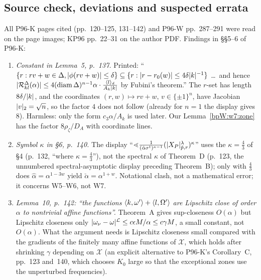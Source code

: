 \subsection{Source check, deviations and suspected errata}\label{bpW:w7:check}

\begin{remark}\label{bpW:w7:errata}
All P96-K pages cited (pp.~120--125, 131--142) and P96-W pp.~287--291 were read on the page images; KP96
pp.~22--31 on the author PDF. Findings in \S\S5--6 of P96-K:
\begin{enumerate}[label=(\alph*)]
\item \emph{Constant in Lemma~5, p.~137.} Printed: ``$\{r:rv+w\in\Delta,\lvert \phi(rv+w)\rvert\le\delta\}\subseteq\{r:
  \lvert r-r_0(w)\rvert\le4\delta\lvert k\rvert^{-1}\}$ \dots\ and hence $\lvert \mathcal R^\Delta_{kl}(\alpha)\rvert\le4(\operatorname{diam}
  \Delta)^{n-1}\alpha\cdot\frac{\langle l\rangle_d}{A_k\lvert k\rvert}$ by Fubini's theorem.'' The $r$-set has length $8\delta/\lvert k\rvert$, and
  the coordinates $(r,w)\mapsto rv+w$, $v\in\{\pm1\}^n$, have Jacobian $\lvert v\rvert_2=\sqrt n$, so the factor $4$ does not
  follow (already for $n=1$ the display gives $8$). Harmless: only the form $c_3\alpha/A_k$ is used later. Our
  Lemma~\ref{bpW:w7:zone} has the factor $8\rho_\zeta/D_A$ with coordinate lines.
\item \emph{Symbol $\kappa$ in \S6, p.~140.} The display ``$\lessdot\frac1{(\hat\alpha\sigma^t)^{\kappa-1}}
  (\lvert X_P\rvert^\lambda_{\check p,r})^\kappa$'' uses the $\kappa=\frac43$ of \S4 (p.~132, ``where $\kappa=\frac43$''), not the
  spectral $\kappa$ of Theorem~D (p.~123, the unnumbered spectral-asymptotic display preceding Theorem~B); only with $\frac43$ does $\hat\alpha=\alpha^{1-3w}$ yield
  $\check\alpha=\alpha^{1+w}$. Notational clash, not a mathematical error; it concerns W5--W6, not W7.
\item \emph{Lemma~10, p.~142: ``the functions $\langle k,\omega'\rangle+\langle l,\Omega'\rangle$ are Lipschitz close of order $\alpha$
  to nontrivial affine functions''.} Theorem~A gives sup-closeness $O(\alpha)$ but Lipschitz closeness only
  $\lvert \omega_\nu-\omega\rvert^{\mathcal L}\le c\epsilon M/\alpha\le c\gamma M$, a small constant, not $O(\alpha)$. What the
  argument needs is Lipschitz closeness small compared with the gradients of the finitely many affine functions of
  $\mathcal X$, which holds after shrinking $\gamma$ depending on $\mathcal X$ (an explicit alternative to P96-K's
  Corollary~C, pp.~123 and~140, which chooses $K_0$ large so that the exceptional zones use the unperturbed frequencies).

\end{enumerate}
\end{remark}
